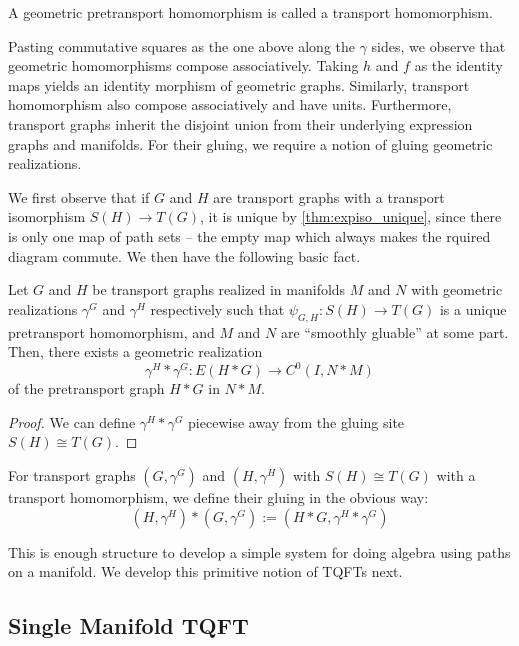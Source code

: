 \documentclass[./Thick_TQFTs_and_Quantum_Information.tex]{subfiles}
\begin{document}
\begin{defn}
A geometric pretransport homomorphism is called a transport homomorphism.
\end{defn}

Pasting commutative squares as the one above along the $\gamma$ sides, we
observe that geometric homomorphisms compose associatively. Taking
$h$ and $f$ as the identity maps yields an identity morphism of geometric
graphs. Similarly, transport homomorphism also compose associatively and have
units. Furthermore, transport graphs inherit the disjoint union from their
underlying expression graphs and manifolds. For their gluing, we require a
notion of gluing geometric realizations.

We first observe that if $G$ and $H$ are transport graphs with a transport
isomorphism $S(H) \to T(G)$, it is unique by \ref{thm:expiso_unique}, since
there is only one map of path sets -- the empty map which always makes the
rquired diagram commute. We then have the following basic fact.

\begin{cor}
Let $G$ and $H$ be transport graphs realized in manifolds
$M$ and $N$ with geometric realizations $\gamma^G$ and
$\gamma^H$ respectively such that $\psi_{G, H} : S(H) \to T(G)$ is a unique
pretransport homomorphism, and $M$ and $N$ are ``smoothly gluable'' at some
part. Then, there exists a geometric realization
\[
  \gamma^H * \gamma^G : E(H * G) \to C^0(I, N * M)
\]
of the pretransport graph $H * G$ in $N * M$.
\end{cor}
\begin{proof}
We can define $\gamma^H * \gamma^G$ piecewise away from the gluing site
$S(H) \cong T(G)$.
\end{proof}

\begin{defn}
For transport graphs $(G, \gamma^G)$ and $(H, \gamma^H)$ with $S(H) \cong T(G)$
with a transport homomorphism, we define their gluing in the obvious way:
\[
  (H, \gamma^H) * (G, \gamma^G) := (H * G, \gamma^H * \gamma^G)
\]
\end{defn}

This is enough structure to develop a simple system for doing algebra using
paths on a manifold. We develop this primitive notion of TQFTs next. 

\subsection{Single Manifold TQFT}
\end{document}
